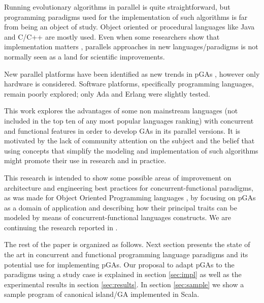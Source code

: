 \documentclass[runningheads,a4paper]{llncs}
\begin{document}
Running evolutionary algorithms in parallel is quite straightforward, but programming paradigms used for the implementation of such algorithms is far from being an object of study. Object oriented or procedural languages like Java and C/C++ are mostly used. Even when some researchers show that implementation matters \cite{DBLP:conf/iwann/MereloRACML11}, parallels approaches in new languages/paradigms is not normally seen as a land for scientific improvements.

New parallel platforms have been identified as new trends in pGAs \cite{Luque2011}, however only hardware is considered. Software platforms, specifically programming languages, remain poorly explored; only Ada \cite{Santos2002} and Erlang \cite{A.Bienz2011,Kerdprasop2013} were slightly tested.


This work explores the advantages of some non mainstream languages (not included in the top ten of any most popular languages ranking) with concurrent and functional features in order to develop GAs in its parallel versions. It is motivated by the lack of community attention on the subject and the belief that using concepts that simplify the modeling and implementation of such algorithms might promote their use in research  and in practice.

This research is intended to show some possible areas of improvement on architecture and engineering best practices for concurrent-functional paradigms, as was made for Object Oriented Programming languages \cite{EO:FEA2000}, by focusing on pGAs as a domain of application and describing how their principal traits can be modeled by means of concurrent-functional languages constructs. We are continuing the research reported in \cite{DBLP:conf/gecco/CruzGGC13,J.Albert-Cruz2013}.

The rest of the paper is organized as follows. Next section presents the state of the art in concurrent and functional programming language paradigms and its potential use for implementing pGAs. Our proposal to adapt pGAs to the paradigms using a study case is explained in section \ref{sec:impl} as well as the experimental results in section \ref{sec:results}. In section \ref{sec:sample} we show a sample program of canonical island/GA implemented in Scala.
\end{document}
